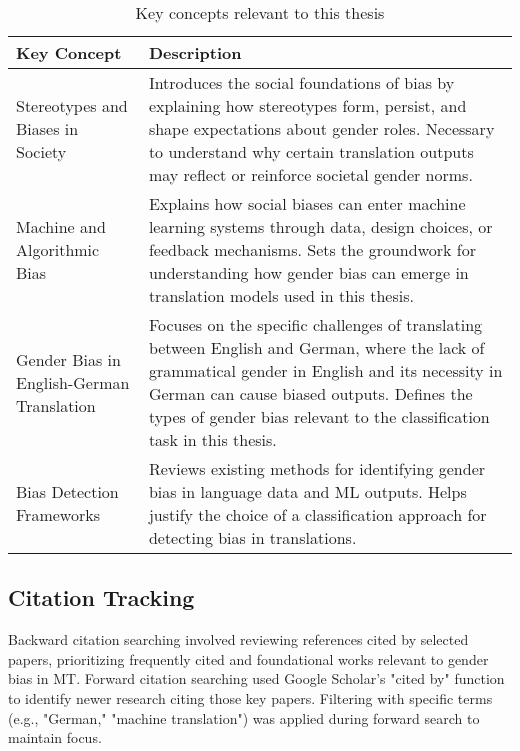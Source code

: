 \renewcommand{\arraystretch}{1.3}
\begin{table}[ht!]
\centering
\begin{tabularx}{\textwidth}{lX}
\toprule
\textbf{Key Concept} & \textbf{Description} \\
\midrule
Stereotypes and Biases in Society & Introduces the social foundations of bias by explaining how stereotypes form, persist, and shape expectations about gender roles. Necessary to understand why certain translation outputs may reflect or reinforce societal gender norms. \\

Machine and Algorithmic Bias & Explains how social biases can enter machine learning systems through data, design choices, or feedback mechanisms. Sets the groundwork for understanding how gender bias can emerge in translation models used in this thesis. \\

Gender Bias in English-German Translation & Focuses on the specific challenges of translating between English and German, where the lack of grammatical gender in English and its necessity in German can cause biased outputs. Defines the types of gender bias relevant to the classification task in this thesis. \\

Bias Detection Frameworks & Reviews existing methods for identifying gender bias in language data and ML outputs. Helps justify the choice of a classification approach for detecting bias in translations. \\

\bottomrule
\end{tabularx}
\caption{Key concepts relevant to this thesis}
\label{tab:key-concepts}
\end{table}

\subsection{Citation Tracking}
Backward citation searching involved reviewing references cited by selected papers, prioritizing frequently cited and foundational works relevant to gender bias in MT. Forward citation searching used Google Scholar's "cited by" function to identify newer research citing those key papers. Filtering with specific terms (e.g., "German," "machine translation") was applied during forward search to maintain focus.

